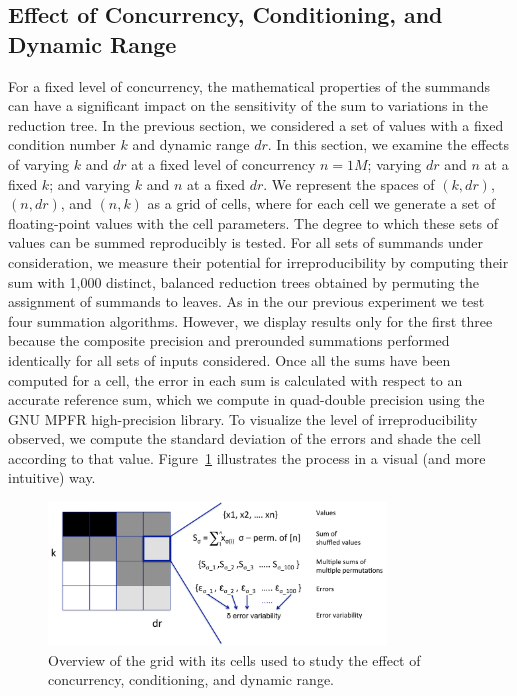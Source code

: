 \subsection{Effect of Concurrency, Conditioning, and Dynamic Range}

For a fixed level of concurrency, the mathematical properties of the
summands can have a significant impact on the sensitivity of the sum
to variations in the reduction tree. In the previous section, we
considered a set of values with a fixed condition number $k$ and
dynamic range $dr$.  In this section, we examine the effects of
varying $k$ and $dr$ at a fixed level of concurrency $n=1M$; varying
$dr$ and $n$ at a fixed $k$; and varying $k$ and $n$ at a fixed
$dr$. We represent the spaces of $(k, dr)$, $(n, dr)$, and $(n, k)$ as
a grid of cells, where for each cell we generate a set of
floating-point values with the cell parameters. The degree to which
these sets of values can be summed reproducibly is tested. For all
sets of summands under consideration, we measure their potential for
irreproducibility by computing their sum with 1,000 distinct, balanced
reduction trees obtained by permuting the assignment of summands to
leaves. As in the our previous experiment we test four summation
algorithms. However, we display results only for the first three
because the composite precision and prerounded summations performed
identically for all sets of inputs considered. Once all the sums have
been computed for a cell, the error in each sum is calculated with
respect to an accurate reference sum, which we compute in quad-double
precision using the GNU MPFR high-precision library. To visualize the
level of irreproducibility observed, we compute the standard deviation
of the errors and shade the cell according to that
value. Figure~\ref{fig:cellsreductions} illustrates the process in a
visual (and more intuitive) way.
\begin{figure}[!htb]
  \centering
  \includegraphics[width=0.8\textwidth]{chapter_2_figures/cell.pdf}
  \caption{Overview of the grid with its cells used to study the
    effect of concurrency, conditioning, and dynamic range.}
  \label{fig:cellsreductions}
\end{figure}

